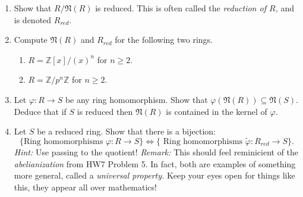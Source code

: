 \documentclass[11pt]{article}
\newcommand{\bZ}{\mathbb{Z}}
\newcommand{\fN}{\mathfrak{N}}
\begin{document}
\begin{enumerate}
{\begin{enumerate}
    \item{Show that $R/\fN(R)$ is reduced.  This is often called the \textit{reduction of $R$,} and is denoted $R_{red}$.}
    \item{Compute $\fN(R)$ and $R_{red}$ for the following two rings.
    \begin{enumerate}
    \item $R = \bZ[x]/(x)^n$ for $n\ge2$.
    \item $R = \bZ/p^n\bZ$ for $n\ge2$.
    \end{enumerate}}
    \item{Let $\varphi:R\to S$ be any ring homomorphism.  Show that $\varphi(\fN(R))\subseteq\fN(S)$.  Deduce that if $S$ is reduced then $\fN(R)$ is contained in the kernel of $\varphi$.}
    \item{Let $S$ be a reduced ring.  Show that there is a bijection:
    \[\{\text{Ring homomorphisms }\varphi:R\to S\}\Longleftrightarrow\{\text{ Ring homomorphisms }\tilde\varphi:R_{red}\to S\}.\]
    \textit{Hint:} Use passing to the quotient!  \textit{Remark: }This should feel reminicient of the \textit{abelianization} from HW7 Problem 5.  In fact, both are examples of something more general, called a \textit{universal property.}  Keep your eyes open for things like this, they appear all over mathematics!}
  \end{enumerate}
  }

\end{enumerate}
\end{document}

